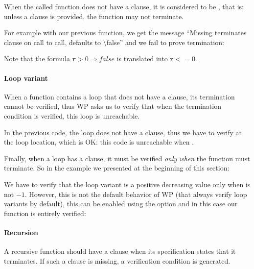 When the called function does not have a  clause, it
is considered to be , that is: unless a
 clause is provided, the function may not terminate.


For example with our previous  function, we get the message
``Missing terminates clause on call to call, defaults to \textbackslash{}false''
and we fail to prove termination:




Note that the formula $\mathtt{r} > 0 \Rightarrow false$ is translated into
$\mathtt{r} <= 0$.


\paragraph{Loop variant}


When a function contains a loop that does not have a 
clause, its termination cannot be verified, thus WP asks us to verify that when
the termination condition is verified, this loop is unreachable.




In the previous code, the loop does not have a 
clause, thus we have to verify 
at the loop location, which is OK: this code is unreachable when
.


Finally, when a loop has a  clause, it must be
verified {\em only when} the function must terminate. So in the example
we presented at the beginning of this section:




We have to verify that the loop variant is a positive decreasing value only
when  is not $-1$. However, this is not the default
behavior of WP (that always verify loop variants by default), this can
be enabled using the option  and
in this case our function is entirely verified:




\paragraph{Recursion}


A recursive function should have a  clause when its
specification states that it terminates. If such a clause is missing, a
verification condition  is generated.


